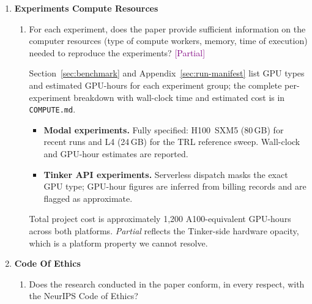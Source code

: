 \documentclass{article}
\newcommand{\answerPartial}[1][]{\textcolor{purple}{[Partial] #1}}
\begin{document}
\begin{enumerate}
\item {\bf Experiments Compute Resources}
    \begin{enumerate}
    \item For each experiment, does the paper provide sufficient
          information on the computer resources (type of compute
          workers, memory, time of execution) needed to reproduce the
          experiments?
    \answerPartial{Section~\ref{sec:benchmark} and
    Appendix~\ref{sec:run-manifest} list GPU
    types and estimated GPU-hours for each experiment group; the
    complete per-experiment breakdown with wall-clock time and
    estimated cost is in \texttt{COMPUTE.md}.
    \begin{itemize}
      \item \textbf{Modal experiments.} Fully specified:
            H100~SXM5 (80\,GB) for recent runs and L4 (24\,GB) for the
            TRL reference sweep.  Wall-clock and GPU-hour estimates are
            reported.
      \item \textbf{Tinker API experiments.} Serverless dispatch masks
            the exact GPU type; GPU-hour figures are inferred from
            billing records and are flagged as approximate.
    \end{itemize}
    Total project cost is approximately 1{,}200 A100-equivalent GPU-hours
    across both platforms.  \emph{Partial} reflects the Tinker-side
    hardware opacity, which is a platform property we cannot resolve.}
    \end{enumerate}

\item {\bf Code Of Ethics}
    \begin{enumerate}
    \item Does the research conducted in the paper conform, in every
          respect, with the NeurIPS Code of Ethics?
    \end{enumerate}


\end{enumerate}
\end{document}
